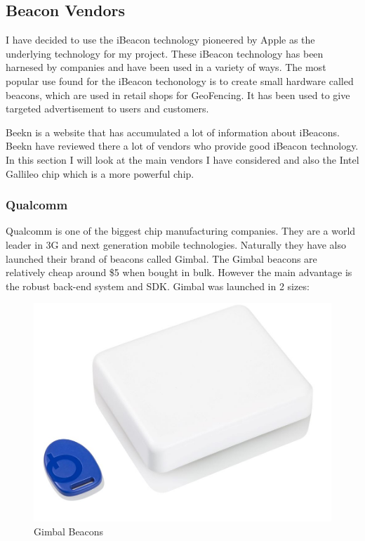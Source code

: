 


\subsection{Beacon Vendors}

I have decided to use the iBeacon technology pioneered by Apple as
the underlying technology for my project. These iBeacon technology has been harnesed by companies and have been used in a variety of ways. The most popular use found for the iBeacon techonology is to create small hardware called beacons, which are used in retail shops for GeoFencing. It has been used to give targeted advertisement to users and customers.

Beekn\cite{beekn} is a website that has accumulated a lot of information about iBeacons. Beekn have reviewed there a lot of vendors who provide good iBeacon technology. In this section I will look at the main vendors I have
considered and also the Intel Gallileo chip which is a more powerful chip.


\subsubsection{Qualcomm}

Qualcomm\cite{quallcomm} is one of the biggest chip manufacturing
companies. They are a world leader in 3G and next generation mobile
technologies. Naturally they have also launched their brand of beacons
called Gimbal\cite{gimbal}. The Gimbal beacons are relatively cheap
around \$5 when bought in bulk. However the main advantage is the
robust back-end system and SDK. Gimbal was launched in 2 sizes:

\begin{figure}[H]
\includegraphics[scale=0.3]{images/gimbal-beacon}

\protect\caption{Gimbal Beacons}
\end{figure}

